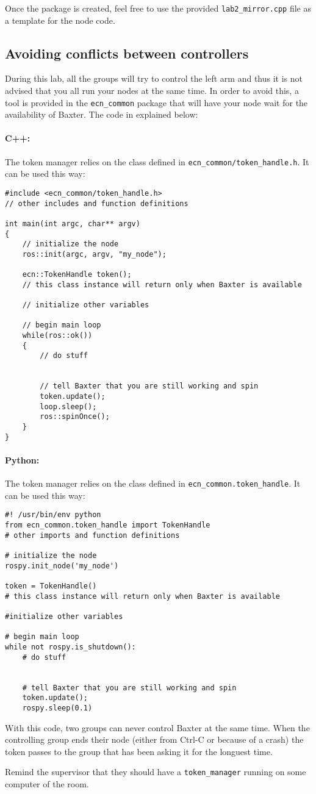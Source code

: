 \documentclass{ecnreport}
\begin{document}
Once the package is created, feel free to use the provided \texttt{lab2\_mirror.cpp} file as a template for the node code.
 
 \subsection{Avoiding conflicts between controllers}
 
 During this lab, all the groups will try to control the left arm and thus it is not advised
 that you all run your nodes at the same time. In order to avoid this, a tool is provided in the  \texttt{ecn\_common}
 package that will have your node wait for the availability of Baxter. The code in explained below:
 
 \paragraph{C++: } The token manager relies on the class defined in \texttt{ecn\_common/token\_handle.h}. It can be used this way:
\cppstyle \begin{lstlisting}
#include <ecn_common/token_handle.h>
// other includes and function definitions

int main(int argc, char** argv)
{
    // initialize the node
    ros::init(argc, argv, "my_node");

    ecn::TokenHandle token();
    // this class instance will return only when Baxter is available
    
    // initialize other variables

    // begin main loop
    while(ros::ok())
    {
        // do stuff
        

        // tell Baxter that you are still working and spin
        token.update();
        loop.sleep();
        ros::spinOnce();
    }
}
\end{lstlisting}


 \paragraph{Python: } The token manager relies on the class defined in \texttt{ecn\_common.token\_handle}. It can be used this way:
\pythonstyle \begin{lstlisting}
#! /usr/bin/env python
from ecn_common.token_handle import TokenHandle
# other imports and function definitions

# initialize the node
rospy.init_node('my_node')

token = TokenHandle()
# this class instance will return only when Baxter is available

#initialize other variables

# begin main loop
while not rospy.is_shutdown():
    # do stuff
    
    
    # tell Baxter that you are still working and spin
    token.update();
    rospy.sleep(0.1)

\end{lstlisting}
With this code, two groups can never control Baxter at the same time. When the controlling group ends their node (either from Ctrl-C or because of a crash) the token
passes to the group that has been asking it for the longuest time.

Remind the supervisor that they should have a \texttt{token\_manager} running on some computer of the room.
\end{document}
